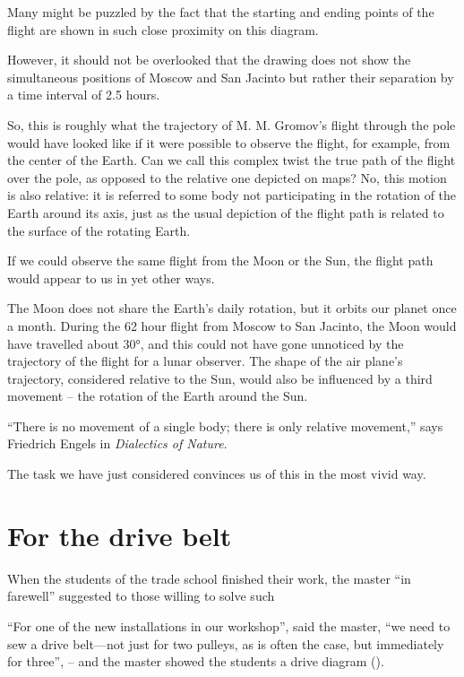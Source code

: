 Many might be puzzled by the fact that the starting and ending points of the flight are shown in such close proximity on this diagram.

However, it should not be overlooked that the drawing does not show the simultaneous positions of Moscow and San Jacinto but rather their separation by a time interval of 2.5 hours.

So, this is roughly what the trajectory of M. M. Gromov's flight through the pole would have looked like if it were possible to observe the flight, for example, from the center of the Earth. Can we call this complex twist the true path of the flight over the pole, as opposed to the relative one depicted on maps? No, this motion is also relative: it is referred to some body not participating in the rotation of the Earth around its axis, just as the usual depiction of the flight path is related to the surface of the rotating Earth.

If we could observe the same flight from the Moon or the Sun, the flight path would appear to us in yet other ways.

The Moon does not share the Earth's daily rotation, but it orbits our planet once a month. During the 62 hour flight from Moscow to San Jacinto, the Moon would have travelled about \ang{30}, and this could not have gone unnoticed by the trajectory of the flight for a lunar observer. The shape of the air plane's trajectory, considered relative to the Sun, would also be influenced by a third movement -- the rotation of the Earth around the Sun.

``There is no movement of a single body; there is only relative movement,'' says Friedrich Engels in \emph{Dialectics of Nature}.

The task we have just considered convinces us of this in the most vivid way.

\clearpage

\section{For the drive belt}
\label{sec-9.13}

When the students of the trade school finished their work, the master ``in farewell'' suggested to those willing to solve such

\ques ``For one of the new installations in our workshop'', said the master, ``we need to sew a drive belt—not just for two pulleys, as is often the case, but immediately for three'', -- and the master showed the students a drive diagram ().

